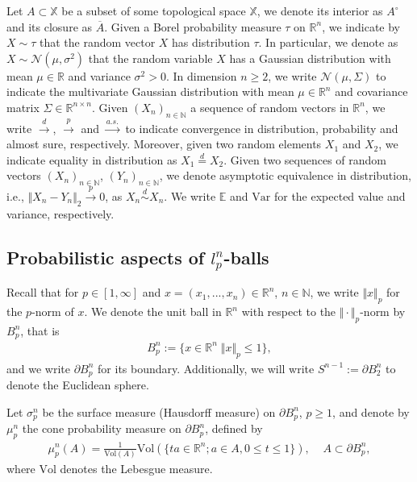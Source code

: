 \documentclass[10pt]{amsart}
\def\R{\mathbb{R}}
\def\N{\mathbb{N}}
\def\vol{\mathrm{Vol}}
\def\E{\mathbb{E}}
\def\var{\text{Var}}
\numberwithin{equation}{section}
\begin{document}
Let $A \subset \mathbb{X}$ be a subset of some topological space $\mathbb{X}$, we denote its interior as $A^\circ$ and its closure as $\overline{A}$. Given a Borel probability measure $\tau$ on $\R^n$, we indicate by $X \sim \tau$ that the random vector $X$ has distribution $\tau$. In particular, we denote as $X \sim \mathcal{N}( \mu , \sigma ^2 )$ that the random variable $X$ has a Gaussian distribution with mean $\mu \in \R$ and variance $\sigma ^2 > 0$. In dimension $n \geq 2$, we write $\mathcal{N} ( \mu , \Sigma)$ to indicate the multivariate Gaussian distribution with mean $\mu \in \R^n$ and covariance matrix $\Sigma \in \R^{n \times n} $. Given $(X_n)_{n \in \N}$ a sequence of random vectors in $\R^n$, we write $ \overset{d}{\to}$, $ \overset{p}{\to}$ and $ \overset{a.s.}{\to}$ to indicate convergence in distribution, probability and almost sure, respectively. Moreover, given two random elements $X_1$ and $X_2$, we indicate equality in distribution as $X_1 \overset{d}{=} X_2$. Given two sequences of random vectors $(X_n)_{n \in \N}$, $(Y_n)_{n \in \N}$, we denote asymptotic equivalence in distribution, i.e., $\Vert X_n - Y_n \Vert _2 \overset{p}{\to} 0$, as $X_n \overset{d}{\sim} X_n$. We write $\E$ and $\var$ for the expected value and variance, respectively.


\subsection{Probabilistic aspects of $l_p^n$-balls}
\label{Section2.2}

Recall that for $p \in [1, \infty ]$ and $x = (x_1, ... , x_n) \in \R^n$, $n \in \N$, we write $\Vert x \Vert _p$ for the $p$-norm of $x$. We denote the unit ball in $\R^n$ with respect to the $\Vert \cdot \Vert _p$-norm by $B_p^n$, that is 
\begin{align*}
B_p^n := \lbrace x \in \R^n \; \Vert x \Vert _p \leq 1 \rbrace,
\end{align*}
and we write $\partial B_p^n$ for its boundary. Additionally, we will write $S^{n-1}:= \partial B_2^n$ to denote the Euclidean sphere.

Let $\sigma _p ^n$ be the surface measure (Hausdorff measure) on $\partial B_p^n$, $p \geq 1$, and denote by $\mu_p ^n$ the cone probability measure on $\partial B_p^n$, defined by
\begin{align*}
\mu_p ^n (A) = \frac{1}{\vol (A)} \vol \left( \lbrace ta \in \R^n ; a \in A, 0\leq t \leq 1 \rbrace \right), \; \; \; \;  A \subset \partial B_p^n,
\end{align*}
where $\vol$ denotes the Lebesgue measure.
\end{document}

